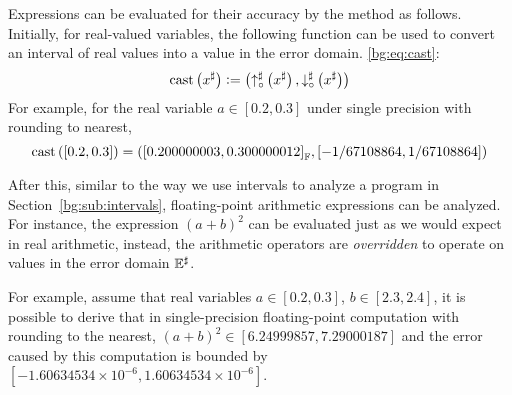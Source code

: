 Expressions can be evaluated for their accuracy by the method as follows.
Initially, for real-valued variables, the following function can be used to
convert an interval of real values into a value in the error domain.
\eqref{bg:eq:cast}:
\begin{equation}
    \mathrm{cast}\left(x^\sharp\right) \vcentcolon= \left(
        \operatorname{\uparrow^\sharp_\circ}\left(x^\sharp\right), \operatorname{\downarrow^\sharp_\circ}\left(x^\sharp\right)
    \right)
    \label{bg:eq:cast}
\end{equation}
For example, for the real variable $a \in [0.2, 0.3]$ under single precision
with rounding to nearest,
\begin{equation}
    \mathrm{cast}\left([0.2, 0.3]\right) = \left(
        {\left[0.200000003, 0.300000012\right]}_\mathbb{F},
        \left[-1/67108864, 1/67108864\right]
    \right)
\end{equation}

After this, similar to the way we use intervals to analyze a program in
Section~\ref{bg:sub:intervals}, floating-point arithmetic expressions can be
analyzed.  For instance, the expression ${(a + b)}^2$ can be evaluated just
as we would expect in real arithmetic, instead, the arithmetic operators are
\emph{overridden} to operate on values in the error domain $\mathbb{E}^\sharp$.

For example, assume that real variables $a \in [0.2, 0.3]$, $b \in [2.3, 2.4]$,
it is possible to derive that in single-precision floating-point computation
with rounding to the nearest, ${(a + b)}^2 \in [6.24999857, 7.29000187]$ and
the error caused by this computation is bounded by $[-1.60634534\times10^{-6},
1.60634534\times10^{-6}]$.
